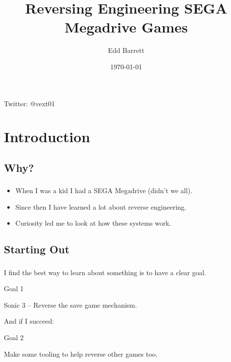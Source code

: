 \documentclass{beamer}
\title{Reversing Engineering SEGA Megadrive Games}
\author{Edd Barrett}
\date{\today}
\begin{document}

\begin{frame}[fragile]
  \titlepage
  \vspace{-4em}
  \begin{center}
  Twitter: @vext01
  \end{center}
\end{frame}


\section{Introduction}

\subsection{Why?}

\begin{frame}[fragile]
\frametitle{\insertsubsection}

\begin{itemize} 
\item When I was a kid I had a SEGA Megadrive (didn't we all).
\vfill
\item Since then I have learned a lot about reverse engineering.
\vfill
\item Curiosity led me to look at how these systems work.
\end{itemize}

\end{frame}


\subsection{Starting Out}
\begin{frame}[fragile]
\frametitle{\insertsubsection}

\vfill
I find the best way to learn about something is to have a clear goal.


\begin{block}{Goal 1}
\begin{center}
Sonic 3 -- Reverse the save game mechanism.
\end{center}
\end{block}

\vfill
And if I succeed:

\begin{block}{Goal 2}
\begin{center}
Make some tooling to help reverse other games too.
\end{center}
\end{block}
\end{frame}
\vfill
\end{document}
